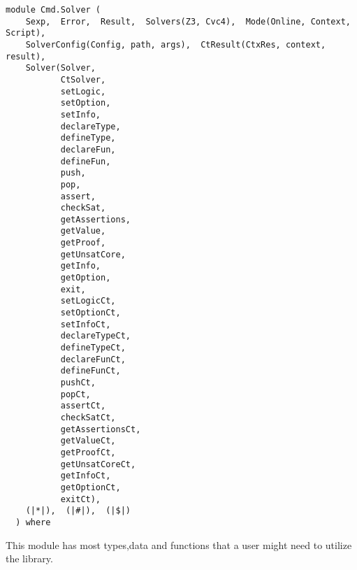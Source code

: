 \label{module:Cmd.Solver}
\haddockbeginheader
{\haddockverb\begin{verbatim}
module Cmd.Solver (
    Sexp,  Error,  Result,  Solvers(Z3, Cvc4),  Mode(Online, Context, Script), 
    SolverConfig(Config, path, args),  CtResult(CtxRes, context, result), 
    Solver(Solver,
           CtSolver,
           setLogic,
           setOption,
           setInfo,
           declareType,
           defineType,
           declareFun,
           defineFun,
           push,
           pop,
           assert,
           checkSat,
           getAssertions,
           getValue,
           getProof,
           getUnsatCore,
           getInfo,
           getOption,
           exit,
           setLogicCt,
           setOptionCt,
           setInfoCt,
           declareTypeCt,
           defineTypeCt,
           declareFunCt,
           defineFunCt,
           pushCt,
           popCt,
           assertCt,
           checkSatCt,
           getAssertionsCt,
           getValueCt,
           getProofCt,
           getUnsatCoreCt,
           getInfoCt,
           getOptionCt,
           exitCt), 
    (|*|),  (|#|),  (|$|)
  ) where\end{verbatim}}
\haddockendheader

This module has most types,data and functions that a user might need to
  utilize the library.
\par

